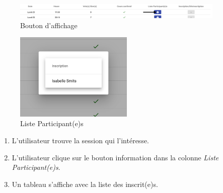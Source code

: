 \vspace{\baselineskip}
\begin{figure}[h]
	\includegraphics[width=0.9\textwidth,center]{Figures/us6-1}
	\caption{Bouton d'affichage}
\end{figure}

\begin{figure}[h]
	\includegraphics[width=0.5\textwidth,center]{Figures/us6-2}
	\caption{Liste Participant(e)s}
\end{figure}

\begin{enumerate}
	\item L'utilisateur trouve la session qui l'intéresse. 
	\item L'utilisateur clique sur le bouton information dans la colonne \textit{Liste Participant(e)s}. 
	\item Un tableau s'affiche avec la liste des inscrit(e)s. 
\end{enumerate}